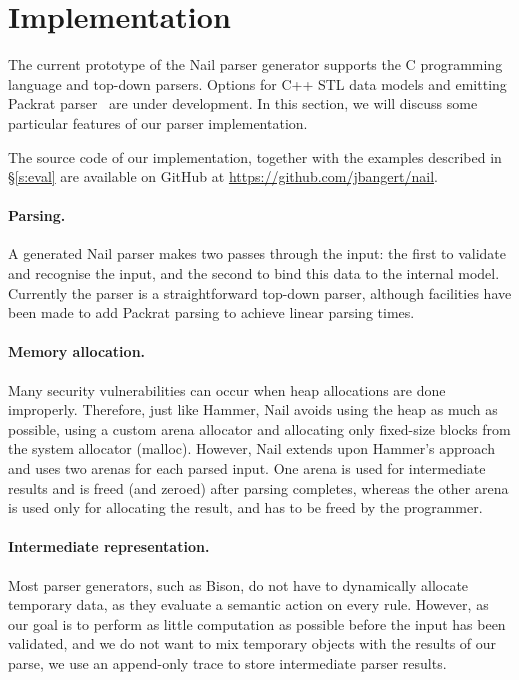 \section{Implementation}
\label{s:impl}

The current prototype of the Nail parser generator supports the C programming
language and top-down parsers. Options for C++ STL data models and emitting
Packrat parser~\cite{packrat-parsing:icfp02} are under development. In
this section, we will discuss some particular features of our parser
implementation.

The source code of our implementation, together with the examples described in
\S\ref{s:eval} are available on GitHub at \url{https://github.com/jbangert/nail}.

\paragraph{Parsing.}

A generated Nail parser makes two passes through the input: the first to
validate and recognise the input, and the second to bind this data to the internal
model. Currently the parser is a straightforward top-down parser, although
facilities have been made to add Packrat parsing to achieve linear parsing
times.

\paragraph{Memory allocation.}

Many security vulnerabilities can occur when heap allocations are done
improperly. Therefore, just like Hammer, Nail avoids using the heap as much as
possible, using a custom arena allocator and allocating only fixed-size blocks
from the system allocator (malloc). However, Nail extends upon Hammer's approach and uses two
arenas for each parsed input. One arena is used for intermediate results and is
freed (and zeroed) after parsing completes, whereas the other arena is used only
for allocating the result, and has to be freed by the programmer.

\paragraph{Intermediate representation.}

Most parser generators, such as Bison, do not have to dynamically allocate
temporary data, as they evaluate a semantic action on every rule. However, as
our goal is to perform as little computation as possible before the input
has been validated, and we do not want to mix temporary objects with the
results of our parse, we use an append-only trace to store intermediate parser
results. 

